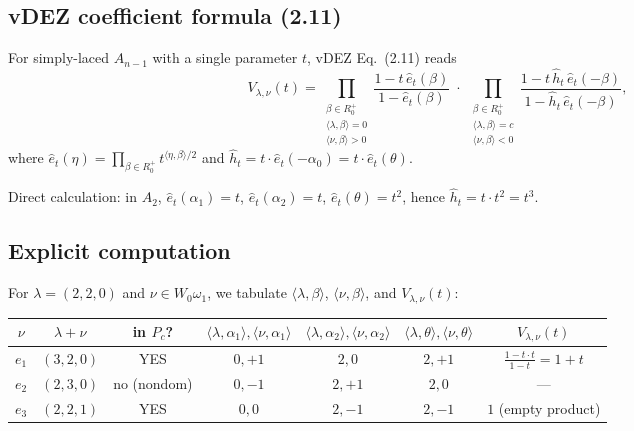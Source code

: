 \documentclass[11pt]{article}
\theoremstyle{definition}
\begin{document}
\subsection{vDEZ coefficient formula (2.11)}

For simply-laced $A_{n-1}$ with a single parameter $t$, vDEZ Eq.~(2.11) reads
\[
V_{\lambda, \nu}(t) = \prod_{\substack{\beta \in R_0^+\\ \langle\lambda,\beta\rangle=0\\ \langle\nu,\beta\rangle>0}} \frac{1 - t\, \hat e_t(\beta)}{1 - \hat e_t(\beta)}
\;\cdot\;
\prod_{\substack{\beta \in R_0^+\\ \langle\lambda,\beta\rangle=c\\ \langle\nu,\beta\rangle<0}} \frac{1 - t\, \hat h_t\, \hat e_t(-\beta)}{1 - \hat h_t\, \hat e_t(-\beta)},
\]
where $\hat e_t(\eta) = \prod_{\beta \in R_0^+} t^{\langle \eta, \beta\rangle/2}$
and $\hat h_t = t \cdot \hat e_t(-\alpha_0) = t \cdot \hat e_t(\theta)$.

Direct calculation: in $A_2$, $\hat e_t(\alpha_1) = t$, $\hat e_t(\alpha_2) = t$,
$\hat e_t(\theta) = t^2$, hence $\hat h_t = t \cdot t^2 = t^3$.

\subsection{Explicit computation}

For $\lambda = (2, 2, 0)$ and $\nu \in W_0\omega_1$, we tabulate $\langle \lambda, \beta\rangle$,
$\langle \nu, \beta\rangle$, and $V_{\lambda,\nu}(t)$:

\begin{center}
\begin{tabular}{|c|c|c|c|c|c|c|}
\hline
$\nu$ & $\lambda + \nu$ & in $P_c$? & $\langle\lambda,\alpha_1\rangle,\langle\nu,\alpha_1\rangle$ & $\langle\lambda,\alpha_2\rangle,\langle\nu,\alpha_2\rangle$ & $\langle\lambda,\theta\rangle,\langle\nu,\theta\rangle$ & $V_{\lambda,\nu}(t)$ \\
\hline
$e_1$ & $(3,2,0)$ & YES     & $0, +1$ & $2, 0$ & $2, +1$ & $\frac{1-t \cdot t}{1-t} = 1 + t$ \\
$e_2$ & $(2,3,0)$ & no (nondom) & $0, -1$ & $2, +1$ & $2, 0$ & --- \\
$e_3$ & $(2,2,1)$ & YES     & $0, 0$ & $2, -1$ & $2, -1$ & $1$ (empty product) \\
\hline
\end{tabular}
\end{center}
\end{document}
